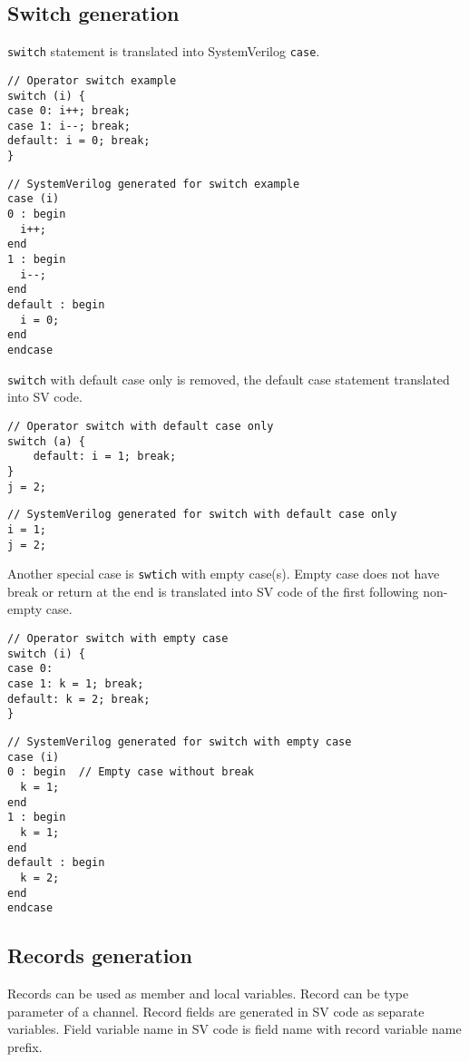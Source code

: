 \subsection{Switch generation}\label{section:switch_gen}

{\tt switch} statement is translated into SystemVerilog {\tt case}.

\begin{lstlisting}[style=mycpp]
// Operator switch example
switch (i) {
case 0: i++; break;
case 1: i--; break;
default: i = 0; break;
}
\end{lstlisting}
%
\begin{lstlisting}[style=myverilog]
// SystemVerilog generated for switch example
case (i)
0 : begin  
  i++;
end
1 : begin
  i--;
end
default : begin
  i = 0;
end
endcase
\end{lstlisting}

{\tt switch} with default case only is removed, the default case statement translated into SV code.
%
\begin{lstlisting}[style=mycpp]
// Operator switch with default case only
switch (a) {
    default: i = 1; break;
}
j = 2;
\end{lstlisting}
%
\begin{lstlisting}[style=myverilog]
// SystemVerilog generated for switch with default case only
i = 1;
j = 2;
\end{lstlisting}

Another special case is {\tt swtich} with empty case(s). Empty case does not have break or return at the end is translated into SV code of the first following non-empty case. 
%
\begin{lstlisting}[style=mycpp]
// Operator switch with empty case
switch (i) {
case 0: 
case 1: k = 1; break;
default: k = 2; break;
}
\end{lstlisting}
%
\begin{lstlisting}[style=myverilog]
// SystemVerilog generated for switch with empty case
case (i)
0 : begin  // Empty case without break
  k = 1;
end
1 : begin
  k = 1;
end
default : begin
  k = 2;
end
endcase
\end{lstlisting}


\subsection{Records generation}\label{section:record_gen}

Records can be used as member and local variables. Record can be type parameter of a channel. Record fields are generated in SV code as separate variables. Field variable name in SV code is field name with record variable name prefix.

